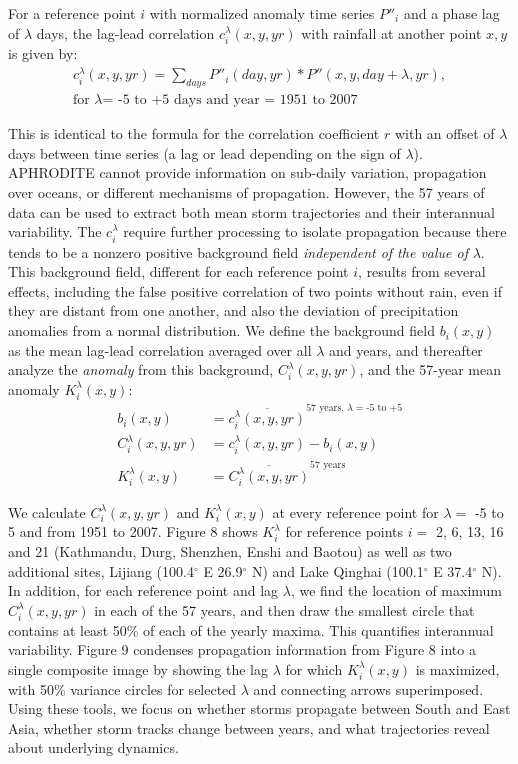 	For a reference point $i$ with normalized anomaly time series $P''_i$ and a phase lag of $\lambda$ days, the lag-lead correlation $c_i^\lambda(x,y,yr)$ with rainfall at another point $x,y$ is given by:
\begin{gather*}
	c_i^\lambda(x,y,yr)=\sum_{days}P''_i(day,yr)*P''(x,y,day+\lambda,yr),\\
	\text{for } \lambda \text{= -5 to +5 days and year = 1951 to 2007}
\end{gather*}
	
	 This is identical to the formula for the correlation coefficient $r$ with an offset of $\lambda$ days between time series (a lag or lead depending on the sign of $\lambda$). APHRODITE cannot provide information on sub-daily variation, propagation over oceans, or different mechanisms of propagation. However, the 57 years of data can be used to extract both mean storm trajectories and their interannual variability. The $c_i^\lambda$ require further processing to isolate propagation because there tends to be a nonzero positive background field \textit{independent of the value of} $\lambda$. This background field, different for each reference point $i$, results from several effects, including the false positive correlation of two points without rain, even if they are distant from one another, and also the deviation of precipitation anomalies from a normal distribution. We define the background field $b_i(x,y)$ as the mean lag-lead correlation averaged over all $\lambda$ and years, and thereafter analyze the \textit{anomaly} from this background, $C_i^\lambda(x,y,yr)$, and the 57-year mean anomaly $K_i^\lambda(x,y)$:
\begin{align*}
	b_i(x,y) &=\overline{c_i^\lambda(x,y,yr)}^{57\text{ years, }\lambda = \text{-5 to +5}} \\
	C_i^\lambda(x,y,yr) &= c_i^\lambda(x,y,yr)-b_i(x,y) \\
	K_i^\lambda(x,y) &= \overline{C_i^\lambda(x,y,yr)}^{57\text{ years}}
\end{align*}
		
	We calculate $C_i^\lambda(x,y,yr)$ and $K_i^\lambda(x,y)$ at every reference point for $\lambda =$ -5 to 5 and from 1951 to 2007. Figure 8 shows $K_i^\lambda$ for reference points $i=$ 2, 6, 13, 16 and 21 (Kathmandu, Durg, Shenzhen, Enshi and Baotou) as well as two additional sites, Lijiang (100.4$^{\circ}$ E 26.9$^{\circ}$ N) and Lake Qinghai (100.1$^{\circ}$ E 37.4$^{\circ}$ N). In addition, for each reference point and lag $\lambda$, we find the location of maximum $C_i^\lambda(x,y,yr)$ in each of the 57 years, and then draw the smallest circle that contains at least 50\% of each of the yearly maxima. This quantifies interannual variability. Figure 9 condenses propagation information from Figure 8 into a single composite image by showing the lag $\lambda$ for which $K_i^\lambda(x,y)$ is maximized, with 50\% variance circles for selected $\lambda$ and connecting arrows superimposed. Using these tools, we focus on whether storms propagate between South and East Asia, whether storm tracks change between years, and what trajectories reveal about underlying dynamics.
	
